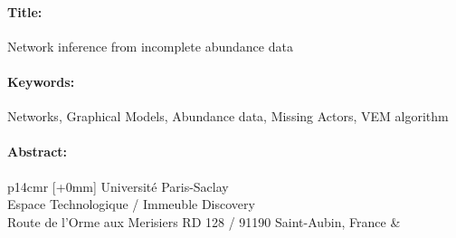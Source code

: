 \documentclass[12pt,a4paper]{book}
\begin{document}
\begin{mdframed}[linecolor=Prune,linewidth=1]
\vspace{-.25cm}
\paragraph*{Title:} Network inference from incomplete abundance data

\begin{small}
\vspace{-.25cm}
\paragraph*{Keywords:} Networks, Graphical Models, Abundance data, Missing Actors, VEM algorithm

\vspace{-.5cm}
\begin{multicols}{2}
\paragraph*{Abstract:} 
\end{multicols}
\end{small}
\end{mdframed}

\vspace{3cm} %
\selectfont
\begin{tabular}{p{14cm}r}
[+0mm]{{\color{Prune} Université Paris-Saclay\\
Espace Technologique / Immeuble Discovery\\
Route de l’Orme aux Merisiers RD 128 / 91190 Saint-Aubin, France}} & %
\end{tabular}
\end{document}
